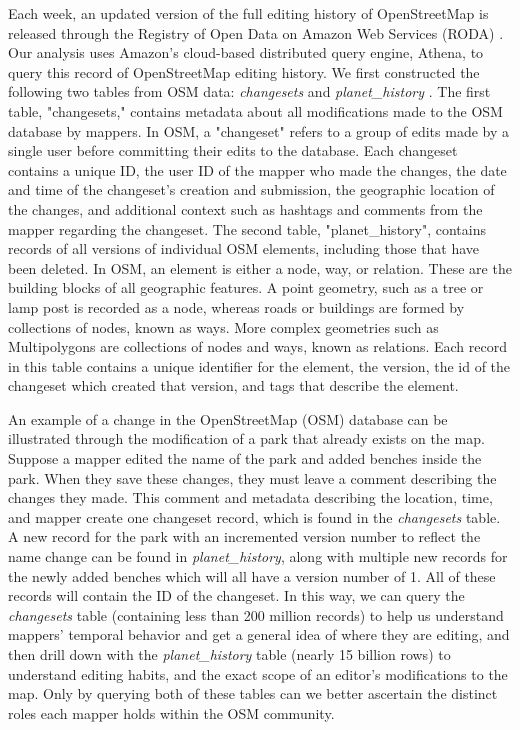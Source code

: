 \documentclass[manuscript,screen,review]{acmart}
\begin{document}
Each week, an updated version of the full editing history of OpenStreetMap is released through the Registry of Open Data on Amazon Web Services (RODA) \cite{OpenStreetMap_on_AWS}. Our analysis uses Amazon's cloud-based distributed query engine, Athena, to query this record of OpenStreetMap editing history. We first constructed the following two tables from OSM data: \textit{changesets} and \textit{planet\_history} \cite{Fitzsimmons2017}. The first table, "changesets," contains metadata about all modifications made to the OSM database by mappers. In OSM, a "changeset" refers to a group of edits made by a single user before committing their edits to the database. Each changeset contains a unique ID, the user ID of the mapper who made the changes, the date and time of the changeset's creation and submission, the geographic location of the changes, and additional context such as hashtags and comments from the mapper regarding the changeset. The second table, "planet\_history", contains records of all versions of individual OSM elements, including those that have been deleted. In OSM, an element is either a node, way, or relation. These are the building blocks of all geographic features. A point geometry, such as a tree or lamp post is recorded as a node, whereas roads or buildings are formed by collections of nodes, known as ways. More complex geometries such as Multipolygons are collections of nodes and ways, known as relations. Each record in this table contains a unique identifier for the element, the version, the id of the changeset which created that version, and tags that describe the element. 

An example of a change in the OpenStreetMap (OSM) database can be illustrated through the modification of a park that already exists on the map. Suppose a mapper edited the name of the park and added benches inside the park. When they save these changes, they must leave a comment describing the changes they made. This comment and metadata describing the location, time, and mapper create one changeset record, which is found in the \textit{changesets} table. A new record for the park with an incremented version number to reflect the name change can be found in \textit{planet\_history}, along with multiple new records for the newly added benches which will all have a version number of 1. All of these records will contain the ID of the changeset. In this way, we can query the \textit{changesets} table (containing less than 200 million records) to help us understand mappers' temporal behavior and get a general idea of where they are editing, and then drill down with the \textit{planet\_history} table (nearly 15 billion rows) to understand editing habits, and the exact scope of an editor's modifications to the map. Only by querying both of these tables can we better ascertain the distinct roles each mapper holds within the OSM community.
\end{document}
